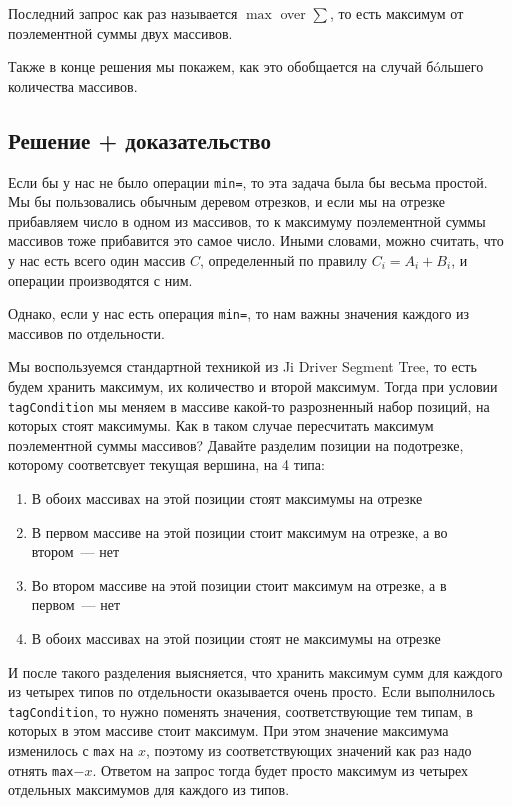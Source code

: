 Последний запрос как раз называется $\max$ over $\sum$, то есть максимум от поэлементной суммы двух массивов.

Также в конце решения мы покажем, как это обобщается на случай бóльшего количества массивов.

\subsection{Решение + доказательство}

Если бы у нас не было операции \verb+min=+, то эта задача была бы весьма простой. Мы бы пользовались обычным деревом отрезков, и если мы на отрезке прибавляем число в одном из массивов, то к максимуму поэлементной суммы массивов тоже прибавится это самое число. Иными словами, можно считать, что у нас есть всего один массив $C$, определенный по правилу $C_i = A_i + B_i$, и операции производятся с ним.

Однако, если у нас есть операция \verb+min=+, то нам важны значения каждого из массивов по отдельности.

Мы воспользуемся стандартной техникой из Ji Driver Segment Tree, то есть будем хранить максимум, их количество и второй максимум. Тогда при условии \verb+tagCondition+ мы меняем в массиве какой-то разрозненный набор позиций, на которых стоят максимумы. Как в таком случае пересчитать максимум поэлементной суммы массивов? Давайте разделим позиции на подотрезке, которому соответсвует текущая вершина, на 4 типа:

\begin{enumerate}
    \item В обоих массивах на этой позиции стоят максимумы на отрезке
    \item В первом массиве на этой позиции стоит максимум на отрезке, а во втором~--- нет
    \item Во втором массиве на этой позиции стоит максимум на отрезке, а в первом~--- нет
    \item В обоих массивах на этой позиции стоят не максимумы на отрезке
\end{enumerate}

И после такого разделения выясняется, что хранить максимум сумм для каждого из четырех типов по отдельности оказывается очень просто. Если выполнилось \verb+tagCondition+, то нужно поменять значения, соответствующие тем типам, в которых в этом массиве стоит максимум. При этом значение максимума изменилось с \verb+max+ на $x$, поэтому из соответствующих значений как раз надо отнять \verb+max+$-x$.
Ответом на запрос тогда будет просто максимум из четырех отдельных максимумов для каждого из типов.

